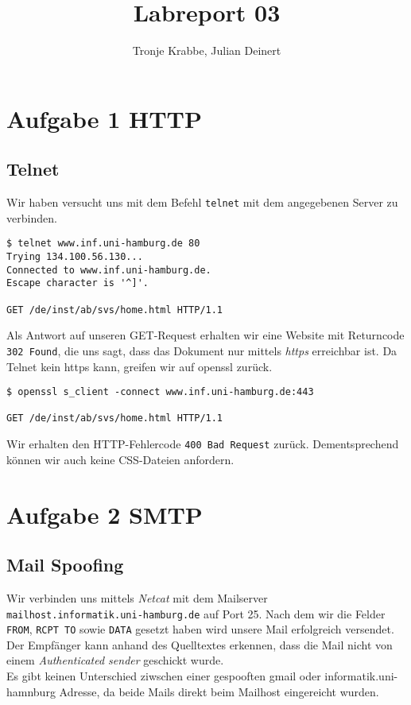 \documentclass[10pt,a4paper]{article}
\author{Tronje Krabbe, Julian Deinert}
\title{Labreport 03}
\begin{document}
\maketitle
\tableofcontents
\newpage


\section*{Aufgabe 1 HTTP}
\subsection{Telnet}
Wir haben versucht uns mit dem Befehl \texttt{telnet} mit dem angegebenen Server zu verbinden.
\begin{verbatim}
$ telnet www.inf.uni-hamburg.de 80                                                                       
Trying 134.100.56.130...
Connected to www.inf.uni-hamburg.de.
Escape character is '^]'.

GET /de/inst/ab/svs/home.html HTTP/1.1
\end{verbatim}
Als Antwort auf unseren GET-Request erhalten wir eine Website mit Returncode \texttt{302 Found}, die uns sagt, dass das Dokument nur mittels \textit{https} erreichbar ist. Da Telnet kein https kann, greifen wir auf openssl zurück.
\begin{verbatim}
$ openssl s_client -connect www.inf.uni-hamburg.de:443

GET /de/inst/ab/svs/home.html HTTP/1.1

\end{verbatim}
Wir erhalten den HTTP-Fehlercode \texttt{400 Bad Request} zurück. Dementsprechend können wir auch keine CSS-Dateien anfordern.

\setcounter{section}{2}
\setcounter{subsection}{0}
\section*{Aufgabe 2 SMTP}
\subsection{Mail Spoofing}
Wir verbinden uns mittels \textit{Netcat} mit dem Mailserver \texttt{mailhost.informatik.uni-hamburg.de} auf Port 25. Nach dem wir die Felder \texttt{FROM}, \texttt{RCPT TO} sowie \texttt{DATA} gesetzt haben wird unsere Mail erfolgreich versendet.
Der Empfänger kann anhand des Quelltextes erkennen, dass die Mail nicht von einem \textit{Authenticated sender} geschickt wurde.\\
Es gibt keinen Unterschied ziwschen einer gespooften gmail oder informatik.uni-hamnburg Adresse, da beide Mails direkt beim Mailhost eingereicht wurden.
\end{document}
